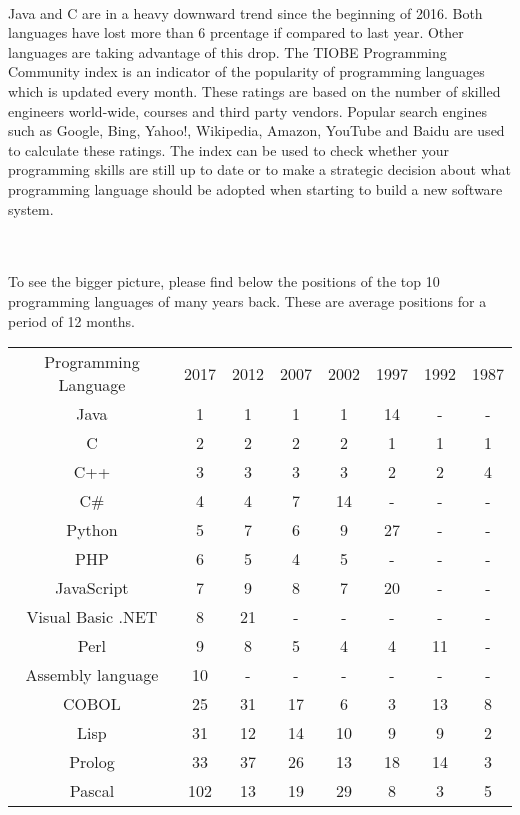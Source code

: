\documentclass[a4paper, 12pt]{report}
\begin{document}
\\
Java and C are in a heavy downward trend since the beginning of 2016. Both languages have lost more than 6 prcentage if compared to 
last year. Other languages are taking advantage of this drop. The TIOBE Programming Community index is an indicator of the 
popularity of programming languages which is updated every month. These ratings are based on the number of skilled engineers 
world-wide, courses and third party vendors. Popular search engines such as Google, Bing, Yahoo!, Wikipedia, Amazon, 
YouTube and Baidu are used to calculate these ratings. The index can be used to check whether your programming skills are still 
up to date or to make a strategic decision about what programming language should be adopted when starting to build a new 
software system.
\\
\\
\begin{center}
\\
To see the bigger picture, please find below the positions of the top 10 programming languages of many years back. These are 
average positions for a period of 12 months.
\end{center}
\begin{center}
\begin{tabular}{||c|c|c|c|c|c|c|c||}
   Programming Language & 2017& 2012& 2007& 2002& 1997& 1992& 1987\\
Java& 1& 1& 1& 1 &14& -& -\\
C &2 &2& 2& 2& 1& 1& 1\\
C++& 3& 3& 3& 3& 2& 2& 4\\
C# &4 &4 &7 &14 &- &- &-\\
Python& 5 &7 &6 &9 &27 &- &-\\
PHP &6 &5 &4 &5 &- &- &-\\
JavaScript& 7& 9& 8& 7& 20& -& -
\\Visual Basic .NET &8 &21& -& - &- &-& -
\\Perl& 9& 8& 5& 4& 4& 11& -
\\Assembly language &10 &-& - &- &- &- &-
\\COBOL &25 &31 &17& 6& 3 &13& 8
\\Lisp &31& 12 &14& 10& 9 &9 &2
\\Prolog &33 &37 &26 &13 &18 &14 &3
\\Pascal& 102& 13& 19& 29& 8 &3 &5\\
\end{tabular}
\end{center}
\\
\\
\\
\\
\begin{center}
    \\
    \\
    \\
\end{center}
\begin{center}
    \\
    \\
    \\
\end{center}
\end{document}
